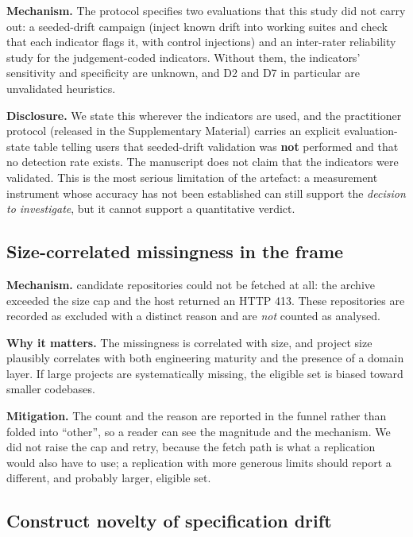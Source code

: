 \textbf{Mechanism.} The protocol specifies two evaluations that this study did not carry out: a
seeded-drift campaign (inject known drift into working suites and check that each indicator flags it,
with control injections) and an inter-rater reliability study for the judgement-coded indicators.
Without them, the indicators' sensitivity and specificity are unknown, and D2 and D7 in particular are
unvalidated heuristics.

\textbf{Disclosure.} We state this wherever the indicators are used, and the practitioner protocol
(released in the Supplementary Material) carries an explicit evaluation-state table telling users that seeded-drift
validation was \textbf{not} performed and that no detection rate exists. The manuscript does not claim
that the indicators were validated. This is the most serious limitation of the artefact: a measurement
instrument whose accuracy has not been established can still support the \emph{decision to investigate},
but it cannot support a quantitative verdict.

\subsection{Size-correlated missingness in the frame}

\textbf{Mechanism.} \Nfetchfailed{} candidate repositories could not be fetched at all: the archive
exceeded the size cap and the host returned an HTTP 413. These repositories are recorded as excluded
with a distinct reason and are \emph{not} counted as analysed.

\textbf{Why it matters.} The missingness is correlated with size, and project size plausibly correlates
with both engineering maturity and the presence of a domain layer. If large projects are systematically
missing, the eligible set is biased toward smaller codebases.

\textbf{Mitigation.} The count and the reason are reported in the funnel rather than folded into
``other'', so a reader can see the magnitude and the mechanism. We did not raise the cap and retry,
because the fetch path is what a replication would also have to use; a replication with more generous
limits should report a different, and probably larger, eligible set.

\subsection{Construct novelty of specification drift}

